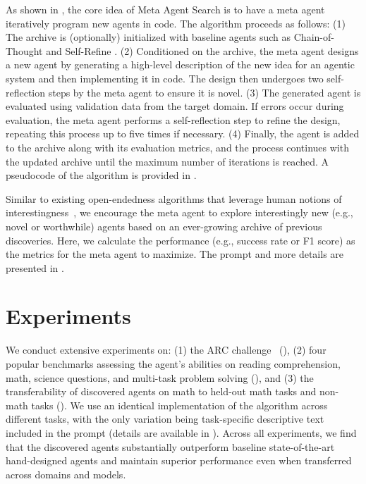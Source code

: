 \documentclass{article} %
\newcommand{\ouralgo}{Meta Agent Search\xspace}
\begin{document}
As shown in , the core idea of \ouralgo is to have a meta agent iteratively program new agents in code. The algorithm proceeds as follows: (1) The archive is (optionally) initialized with baseline agents such as Chain-of-Thought \citep{wei2022chain} and Self-Refine \citep{madaan2024self,shinn2024reflexion}. (2) Conditioned on the archive, the meta agent designs a new agent by generating a high-level description of the new idea for an agentic system and then implementing it in code. The design then undergoes two self-reflection \citep{madaan2024self,shinn2024reflexion} steps by the meta agent to ensure it is novel. (3) The generated agent is evaluated using validation data from the target domain. If errors occur during evaluation, the meta agent performs a self-reflection step to refine the design, repeating this process up to five times if necessary. (4) Finally, the agent is added to the archive along with its evaluation metrics, and the process continues with the updated archive until the maximum number of iterations is reached. A pseudocode of the algorithm is provided in .

Similar to existing open-endedness algorithms that leverage human notions of interestingness~\citep{zhang2024omni,lu2024intelligent}, we encourage the meta agent to explore interestingly new (e.g., novel or worthwhile) agents based on an ever-growing archive of previous discoveries. Here, we calculate the performance (e.g., success rate or F1 score) as the metrics for the meta agent to maximize. The prompt and more details are presented in .

\section{Experiments}
\label{section:experiment}

We conduct extensive experiments on: (1) the ARC challenge~\citep{chollet2019measure} (), (2) four popular benchmarks assessing the agent's abilities on reading comprehension, math, science questions, and multi-task problem solving (), and (3) the transferability of discovered agents on math to held-out math tasks and non-math tasks (). We use an identical implementation of the algorithm across different tasks, with the only variation being task-specific descriptive text included in the prompt (details are available in ). 
Across all experiments, we find that the discovered agents substantially outperform baseline state-of-the-art hand-designed agents and maintain superior
performance even when transferred across domains and models.
\end{document}
